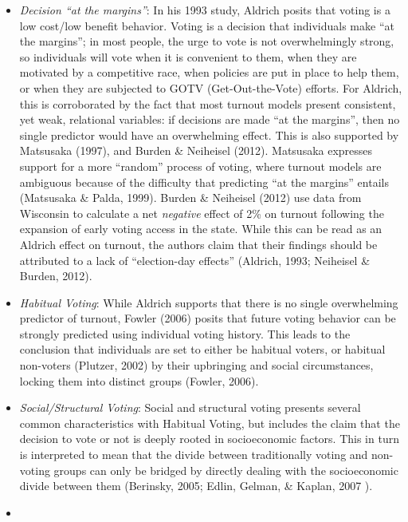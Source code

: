 \documentclass[12pt,twoside]{reedthesis}
\begin{document}
  \begin{itemize}
  \item
    \emph{Decision ``at the margins''}: In his 1993 study, Aldrich posits
    that voting is a low cost/low benefit behavior. Voting is a decision
    that individuals make ``at the margins''; in most people, the urge to
    vote is not overwhelmingly strong, so individuals will vote when it is
    convenient to them, when they are motivated by a competitive race,
    when policies are put in place to help them, or when they are
    subjected to GOTV (Get-Out-the-Vote) efforts. For Aldrich, this is
    corroborated by the fact that most turnout models present consistent,
    yet weak, relational variables: if decisions are made ``at the
    margins'', then no single predictor would have an overwhelming effect.
    This is also supported by Matsusaka (1997), and Burden \& Neiheisel
    (2012). Matsusaka expresses support for a more ``random'' process of
    voting, where turnout models are ambiguous because of the difficulty
    that predicting ``at the margins'' entails (Matsusaka \& Palda, 1999).
    Burden \& Neiheisel (2012) use data from Wisconsin to calculate a net
    \emph{negative} effect of 2\% on turnout following the expansion of
    early voting access in the state. While this can be read as an Aldrich
    effect on turnout, the authors claim that their findings should be
    attributed to a lack of ``election-day effects'' (Aldrich, 1993;
    Neiheisel \& Burden, 2012).
  \item
    \emph{Habitual Voting}: While Aldrich supports that there is no single
    overwhelming predictor of turnout, Fowler (2006) posits that future
    voting behavior can be strongly predicted using individual voting
    history. This leads to the conclusion that individuals are set to
    either be habitual voters, or habitual non-voters (Plutzer, 2002) by
    their upbringing and social circumstances, locking them into distinct
    groups (Fowler, 2006).
  \item
    \emph{Social/Structural Voting}: Social and structural voting presents
    several common characteristics with Habitual Voting, but includes the
    claim that the decision to vote or not is deeply rooted in
    socioeconomic factors. This in turn is interpreted to mean that the
    divide between traditionally voting and non-voting groups can only be
    bridged by directly dealing with the socioeconomic divide between them
    (Berinsky, 2005; Edlin, Gelman, \& Kaplan, 2007 ).
  \item

\end{itemize}
\end{document}
